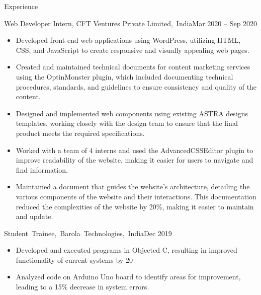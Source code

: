 \documentclass[]{mcdowellcv}
\begin{document}
	\begin{cvsection}{Experience}
		\begin{cvsubsection}{Web Developer Intern, CFT Ventures Private Limited,~India}{}{Mar 2020 – Sep 2020}
			\begin{itemize}
            \item Developed front-end web applications using WordPress, utilizing HTML, CSS, and JavaScript to create responsive and visually appealing web pages.
            \item Created and maintained technical documents for content marketing services using the OptinMonster plugin, which included documenting technical procedures, standards, and guidelines to ensure consistency and quality of the content.
		\item Designed and implemented web components using existing ASTRA      designs templates, working closely with the design team to ensure       that the final product meets the required specifications.
            \item Worked with a team of 4 interns and used the AdvancedCSSEditor plugin to improve readability of the website, making it easier for users to navigate and find information.
            \item Maintained a document that guides the website's architecture, detailing the various components of the website and their interactions. This documentation reduced the complexities of the website by 20\%, making it easier to maintain and update.
			\end{itemize}
		\end{cvsubsection}
		
            \begin{cvsubsection}{Student~Trainee,~Barola~Technologies,~India}{}{Dec 2019}
			\begin{itemize}
            	\item Developed and executed programs in Objected C, resulting in improved functionality of current systems by 20%
				\item Analyzed code on Arduino Uno board to identify areas for improvement, leading to a 15\% decrease in system errors.
			\end{itemize}
		\end{cvsubsection}

	\end{cvsection}
\end{document}
